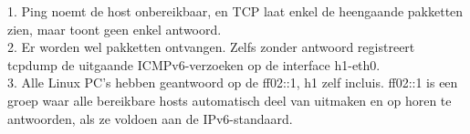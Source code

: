 1. Ping noemt de host onbereikbaar, en TCP laat enkel de heengaande pakketten zien, maar toont geen enkel antwoord.\\
2. Er worden wel pakketten ontvangen. Zelfs zonder antwoord registreert tcpdump de uitgaande ICMPv6-verzoeken op de interface h1-eth0.\\
3. Alle Linux PC's hebben geantwoord op de ff02::1, h1 zelf incluis. ff02::1 is een groep waar alle bereikbare hosts automatisch deel van uitmaken en op horen te antwoorden, als ze voldoen aan de IPv6-standaard.